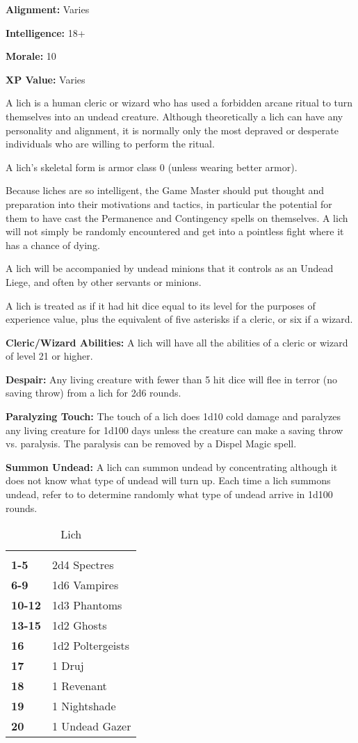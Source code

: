 \begin{multicols*}{2}
{\textbf{Alignment:} Varies

\textbf{Intelligence:} 18+

\textbf{Morale:} 10

\textbf{XP Value:} Varies}

A lich is a human cleric or wizard who has used a forbidden arcane ritual to turn themselves into an undead creature. Although theoretically a lich can have any personality and alignment, it is normally only the most depraved or desperate individuals who are willing to perform the ritual.

A lich’s skeletal form is armor class 0 (unless wearing better armor).

Because liches are so intelligent, the Game Master should put thought and preparation into their motivations and tactics, in particular the potential for them to have cast the Permanence and Contingency spells on themselves. A lich will not simply be randomly encountered and get into a pointless fight where it has a chance of dying.

A lich will be accompanied by undead minions that it controls as an Undead Liege, and often by other servants or minions.

A lich is treated as if it had hit dice equal to its level for the purposes of experience value, plus the equivalent of five asterisks if a cleric, or six if a wizard.

\textbf{Cleric/Wizard Abilities:} A lich will have all the abilities of a cleric or wizard of level 21 or higher.

\textbf{Despair:} Any living creature with fewer than 5 hit dice will flee in terror (no saving throw) from a lich for 2d6 rounds.

\textbf{Paralyzing Touch:} The touch of a lich does 1d10 cold damage and paralyzes any living creature for 1d100 days unless the creature can make a saving throw vs. paralysis. The paralysis can be removed by a Dispel Magic spell.

\textbf{Summon Undead:} A lich can summon undead by concentrating although it does not know what type of undead will turn up. Each time a lich summons undead, refer to  to determine randomly what type of undead arrive in 1d100 rounds.

\begin {table}[H]
	\caption{Lich}\label{tab:Lich}
  \begin{tabularx}{\columnwidth}{>{\bfseries}YY}
	 & \\
	1-5 & 2d4 Spectres\\
	6-9 & 1d6 Vampires\\
	10-12 & 1d3 Phantoms\\
	13-15 & 1d2 Ghosts\\
	16 & 1d2 Poltergeists\\
	17 & 1 Druj\\
	18 & 1 Revenant\\
	19 & 1 Nightshade\\
	20 & 1 Undead Gazer
  \end {tabularx}
\end {table}


\end{multicols*}
